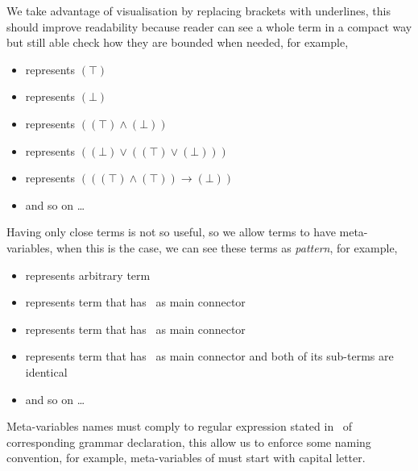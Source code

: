 \documentclass[master.tex]{subfiles}
\begin{document}
\newcommand{\propTop}[0]{\bat{\pifmt{$\top$}}}
\newcommand{\propBot}[0]{\bat{\pifmt{$\bot$}}}
\newcommand{\propAnd}[0]{\pifmt{$\wedge$}}
\newcommand{\propOr}[0]{\pifmt{$\vee$}}
\newcommand{\propNot}[0]{\pifmt{$\neg$}}
\newcommand{\propImp}[0]{\pifmt{$\rightarrow$}}
\newcommand{\propIff}[0]{\pifmt{$\leftrightarrow$}}

We take advantage of visualisation by replacing brackets with underlines, this
should improve readability because reader can see a whole term in a compact
way but still able check how they are bounded when needed, for example,
\begin{itemize}
  \item \propTop{} represents $(\top)$
  \item \propBot{} represents $(\bot)$
  \item \bat{\propTop\propAnd\propBot} represents $((\top) \wedge (\bot))$
  \item \bat{\propBot\propOr\bat{\propTop\propOr\propBot}}
    represents $((\bot) \vee ((\top) \vee (\bot)))$
  \item \bat{\bat{\propTop\propAnd\propTop}\propImp\propBot}
    represents $(((\top) \wedge (\top)) \rightarrow (\bot))$
  \item and so on \dots
\end{itemize}

Having only close terms is not so useful, so we allow terms to have
meta-variables, when this is the case, we can see these terms as \emph{pattern},
for example,
\begin{itemize}
  \item {} represents arbitrary  term
  \item \bat{\propNot\pvar{A}} represents  term that has
    \propNot\ as main connector
  \item \bat{\pvar{A}\propAnd\pvar{B}} represents  term that has
    \propAnd\ as main connector
  \item \bat{\pvar{A}\propAnd\pvar{A}} represents  term that has
    \propAnd\ as main connector and both of its sub-terms are identical
  \item and so on \dots
\end{itemize}

Meta-variables names must comply to regular expression stated in \kVarRegex\ of
corresponding grammar declaration, this allow us to enforce some naming
convention, for example, meta-variables of  must start with capital
letter.
\end{document}
